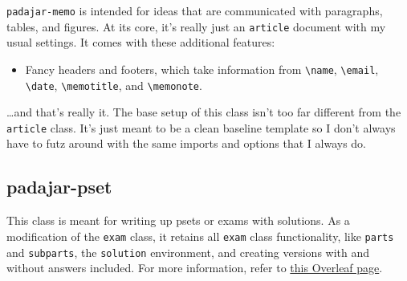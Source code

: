 \documentclass[11pt]{padajar-memo}
\newcommand{\ttslash}[1]{\texttt{\textbackslash #1}}
\begin{document}
\texttt{padajar-memo} is intended for ideas that are communicated with paragraphs, tables, and figures. At its core, it's really just an \texttt{article} document with my usual settings. It comes with these additional features:

\begin{itemize}
	\item Fancy headers and footers, which take information from \ttslash{name}, \ttslash{email}, \ttslash{date}, \ttslash{memotitle}, and \ttslash{memonote}.
\end{itemize}

\dots and that's really it. The base setup of this class isn't too far different from the \texttt{article} class. It's just meant to be a clean baseline template so I don't always have to futz around with the same imports and options that I always do.

\subsection{padajar-pset}
This class is meant for writing up psets or exams with solutions. As a modification of the \texttt{exam} class, it retains all \texttt{exam} class functionality, like \texttt{parts} and \texttt{subparts}, the \texttt{solution} environment, and creating versions with and without answers included. For more information, refer to \href{https://www.overleaf.com/learn/latex/Typesetting\_exams\_in\_LaTeX}{this Overleaf page}.
\end{document}
